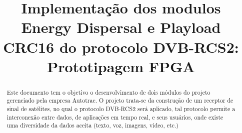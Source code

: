 \documentclass[conference]{IEEEtran}
\begin{document}
    \title{Implementação dos modulos Energy Dispersal e Playload CRC16 do protocolo DVB-RCS2:\\
Prototipagem FPGA}


\author{
\and

}



\maketitle




\begin{abstract}
Este documento tem o objetivo o desenvolvimento de dois módulos do projeto gerenciado pela empresa Autotrac. O projeto trata-se da construção de um receptor de sinal de satélites, no qual o protocolo DVB-RCS2 será aplicado, tal protocolo permite a interconexão entre dados, de aplicações em tempo real, e seus usuários, onde existe uma diversidade da dados aceita (texto, voz, imagens, video, etc.)
\end{abstract}
\end{document}
